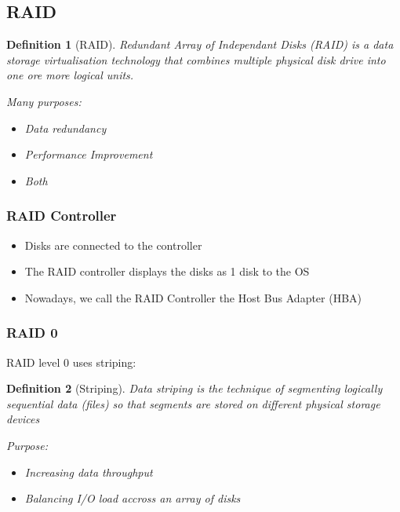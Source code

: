 \documentclass{article}
\newtheorem{theorem}{Definition}[section]
\begin{document}
\subsection{RAID}

\begin{theorem}[RAID]
    Redundant Array of Independant Disks (RAID) is a data storage virtualisation technology that combines multiple physical disk drive into one ore more logical units.

    Many purposes:

    \begin{itemize}
        \item Data redundancy
        \item Performance Improvement
        \item Both
    \end{itemize}
\end{theorem}

\subsubsection{RAID Controller}

\begin{itemize}
    \item Disks are connected to the controller
    \item The RAID controller displays the disks as 1 disk to the OS
    \item Nowadays, we call the RAID Controller the Host Bus Adapter (HBA)
\end{itemize}

\subsubsection{RAID 0}

RAID level 0 uses striping:

\begin{theorem}[Striping]
    Data striping is the technique of segmenting logically sequential data (files) so that segments are stored on different physical storage devices

    Purpose:

    \begin{itemize}
        \item Increasing data throughput
        \item Balancing I/O load accross an array of disks
    \end{itemize}
\end{theorem}
\end{document}
